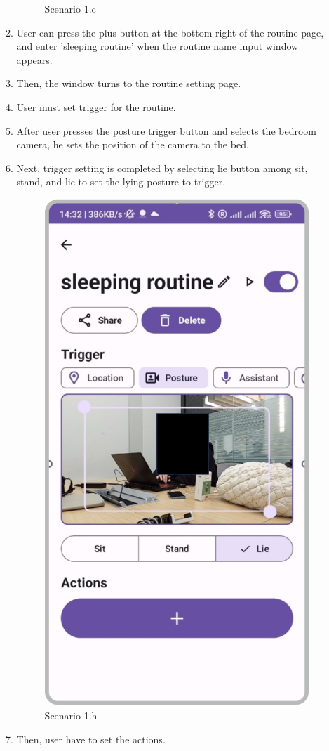 \begin{enumerate}
\begin{enumerate}
\begin{figure}
            \caption{Scenario 1.c}
            \label{fig:enter-label}
        \end{figure}
        \item User can press the plus button at the bottom right of the routine page, and enter 'sleeping routine' when the routine name input window appears. \\
        \item Then, the window turns to the routine setting page.\\
        \item User must set trigger for the routine. \\
        \item After user presses the posture trigger button and selects the bedroom camera, he sets the position of the camera to the bed. \\
        \item Next, trigger setting is completed by selecting lie button among sit, stand, and lie to set the lying posture to trigger.\\
        \begin{figure}
            \centering
            \includegraphics[width=0.5\linewidth]{imgs/usercase/usercase_scenario1_8.png}
            \caption{Scenario 1.h}
            \label{fig:enter-label}
        \end{figure}
        \item Then, user have to set the actions. \\

\end{enumerate}
\end{enumerate}

